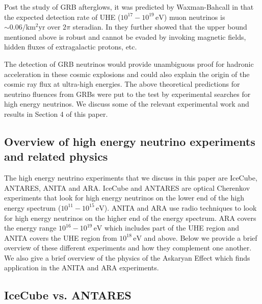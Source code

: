 \documentclass[12pt]{article}
\begin{document}
\begin{doublespace}
Post the study of GRB afterglows, it was predicted by Waxman-Bahcall in \cite{afterglows} that the expected detection rate of UHE ($10^{17} - 10^{19} \, \mathrm{eV}$) muon neutrinos is $\sim 0.06/\mathrm{ km^2 yr}$ over $2 \pi$ steradian. In \cite{ubrobust} they further showed that the upper bound mentioned above is robust and cannot be evaded by invoking magnetic fields, hidden fluxes of extragalactic protons, etc. \par
The detection of GRB neutrinos would provide unambiguous proof for hadronic acceleration in these cosmic explosions and could also explain the origin of the cosmic ray flux at ultra-high energies. The above theoretical predictions for neutrino fluences from GRBs were put to the test by experimental searches for high energy neutrinos. We discuss some of the relevant experimental work and results in Section 4 of this paper. 


\begin{singlespace}
\section{Overview of high energy neutrino experiments and related physics}
\end{singlespace}

The high energy neutrino experiments that we discuss in this paper are IceCube, ANTARES, ANITA and ARA. IceCube and ANTARES are optical Cherenkov experiments that look for high energy neutrinos on the lower end of the high energy spectrum ($10^{11} - 10^{15}\, \mathrm{eV}$). ANITA and ARA use radio techniques to look for high energy neutrinos on the higher end of the energy spectrum. ARA covers the energy range $10^{16} - 10^{19}\, \mathrm{eV}$ which includes part of the UHE region and ANITA covers the UHE region from $10^{18}\, \mathrm{eV}$ and above. Below we provide a brief overview of these different experiments and how they complement one another. We also give a brief overview of the physics of the Askaryan Effect \cite{Askaryan} which finds application in the ANITA and ARA experiments. 

\subsection{IceCube vs. ANTARES} 


\end{doublespace}
\end{document}
